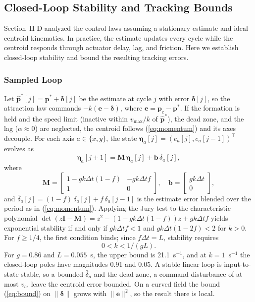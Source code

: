 \documentclass[lettersize,journal]{IEEEtran}
\newcommand{\rev}[1]{#1}
\begin{document}
\subsection{Closed-Loop Stability and Tracking Bounds}
\label{sec:stability}

Section~II-D analyzed the control laws assuming a stationary estimate and ideal centroid kinematics. In practice, the estimate updates every cycle while the centroid responds through actuator delay, lag, and friction. Here we establish closed-loop stability and bound the resulting tracking errors.

\subsubsection{Sampled Loop}
Let $\hat{\mathbf{p}}^*[j] = \mathbf{p}^* + \boldsymbol{\delta}[j]$ be the estimate at cycle $j$ with error $\boldsymbol{\delta}[j]$, so the attraction law commands $-k(\mathbf{e} - \boldsymbol{\delta})$, where $\mathbf{e} = \mathbf{p}_c - \mathbf{p}^*$. If the formation is held and the speed limit (inactive within $v_{\max}/k$ of $\hat{\mathbf{p}}^*$), the dead zone, and the lag ($\alpha \approx 0$) are neglected, the centroid follows (\ref{eq:momentum}) and its axes decouple. For each axis $a \in \{x, y\}$, the state $\boldsymbol{\eta}_a[j] = (e_a[j], e_a[j-1])^\top$ evolves as
\begin{equation}\label{eq:cl}
\boldsymbol{\eta}_a[j{+}1] = \mathbf{M}\,\boldsymbol{\eta}_a[j] + \mathbf{b}\,\bar{\delta}_a[j],
\end{equation}
where
\[
\mathbf{M} = \begin{bmatrix} 1-gk\Delta t(1-f) & -gk\Delta t f \\ 1 & 0 \end{bmatrix}, \quad \mathbf{b} = \begin{bmatrix} gk\Delta t \\ 0 \end{bmatrix},
\]
and $\bar{\delta}_a[j] = (1-f)\,\delta_a[j] + f\,\delta_a[j-1]$ is the estimate error blended over the period as in (\ref{eq:momentum}). Applying the Jury test to the characteristic polynomial $\det(z\mathbf{I} - \mathbf{M}) = z^2 - (1 - gk\Delta t(1-f))z + gk\Delta t f$ yields exponential stability if and only if $gk\Delta t f < 1$ and $gk\Delta t(1-2f) < 2$ for $k > 0$. For $f \ge 1/4$, the first condition binds; since $f\Delta t = L$, stability requires
\begin{equation}\label{eq:kmax}
0 < k < 1/(gL).
\end{equation}
For $g = 0.86$ and $L = 0.055$~s, the upper bound is \rev{21.1}~s$^{-1}$, and at $k = 1$~s$^{-1}$ the closed-loop poles have magnitudes \rev{0.91} and \rev{0.05}. A stable linear loop is input-to-state stable, so a bounded $\bar{\delta}_a$ and the dead zone, a command disturbance of at most $v_c$, leave the centroid error bounded. On a curved field the bound (\ref{eq:bound}) on $\|\boldsymbol{\delta}\|$ grows with $\|\mathbf{e}\|^2$, so the result there is local.
\end{document}
